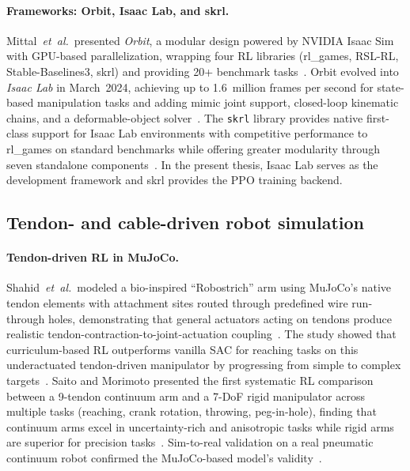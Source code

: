 \paragraph{Frameworks: Orbit, Isaac Lab, and skrl.}
Mittal~\emph{et~al.}\ presented \emph{Orbit}, a modular design powered by
NVIDIA Isaac Sim with GPU-based parallelization, wrapping four \ac{RL}
libraries (rl\_games, RSL-RL, Stable-Baselines3, skrl) and providing
20+ benchmark tasks~\cite{Mittal2023Orbit}.
Orbit evolved into \emph{Isaac Lab} in March~2024, achieving up to
1.6~million frames per second for state-based manipulation tasks and
adding mimic joint support, closed-loop kinematic chains, and a
deformable-object solver~\cite{Mittal2025IsaacLab}.
The \texttt{skrl} library provides native first-class support for Isaac Lab
environments with competitive performance to rl\_games on standard
benchmarks while offering greater modularity through seven standalone
components~\cite{SerranoMunoz2023skrl}.
In the present thesis, Isaac Lab serves as the development framework and
skrl provides the \ac{PPO} training backend.

\subsection{Tendon- and cable-driven robot simulation}
\label{subsec:prior_tendon_sim}

\paragraph{Tendon-driven RL in MuJoCo.}
Shahid~\emph{et~al.}\ modeled a bio-inspired ``Robostrich'' arm using
MuJoCo's native tendon elements with attachment sites routed through
predefined wire run-through holes, demonstrating that general actuators
acting on tendons produce realistic tendon-contraction-to-joint-actuation
coupling~\cite{Shahid2023CurriculumTendon}.
The study showed that curriculum-based \ac{RL} outperforms vanilla SAC for
reaching tasks on this underactuated tendon-driven manipulator by
progressing from simple to complex targets~\cite{Shahid2023CurriculumTendon}.
Saito and Morimoto presented the first systematic \ac{RL} comparison between
a 9-tendon continuum arm and a 7-\ac{DoF} rigid manipulator across multiple
tasks (reaching, crank rotation, throwing, peg-in-hole), finding that
continuum arms excel in uncertainty-rich and anisotropic tasks while rigid
arms are superior for precision tasks~\cite{Saito2022ContinuumRL}.
Sim-to-real validation on a real pneumatic continuum robot confirmed the
MuJoCo-based model's validity~\cite{Saito2022ContinuumRL}.

